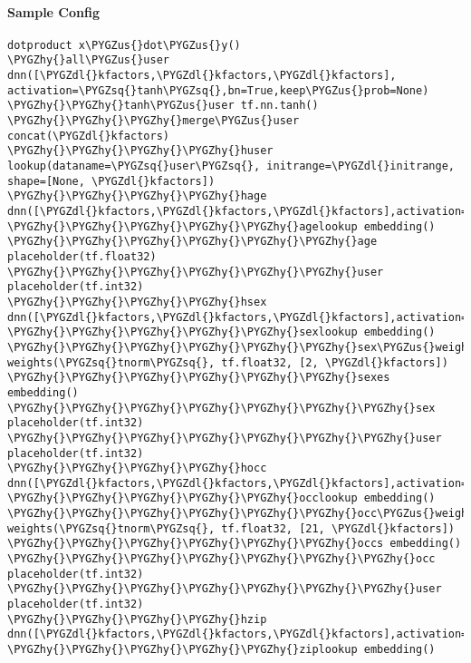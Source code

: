 \documentclass[letterpaper,10pt,english]{sphinxmanual}
\def\PYGZus{\char`\_}
\def\PYGZdl{\char`\$}
\def\PYGZhy{\char`\-}
\def\PYGZsq{\char`\'}
\renewcommand\PYGZsq{\textquotesingle}
\begin{document}
\paragraph{Sample Config}
\label{models:id5}
\begin{Verbatim}[commandchars=\\\{\}]
dotproduct x\PYGZus{}dot\PYGZus{}y()
\PYGZhy{}all\PYGZus{}user dnn([\PYGZdl{}kfactors,\PYGZdl{}kfactors,\PYGZdl{}kfactors], activation=\PYGZsq{}tanh\PYGZsq{},bn=True,keep\PYGZus{}prob=None)
\PYGZhy{}\PYGZhy{}tanh\PYGZus{}user tf.nn.tanh()
\PYGZhy{}\PYGZhy{}\PYGZhy{}merge\PYGZus{}user concat(\PYGZdl{}kfactors)
\PYGZhy{}\PYGZhy{}\PYGZhy{}\PYGZhy{}huser lookup(dataname=\PYGZsq{}user\PYGZsq{}, initrange=\PYGZdl{}initrange, shape=[None, \PYGZdl{}kfactors])
\PYGZhy{}\PYGZhy{}\PYGZhy{}\PYGZhy{}hage dnn([\PYGZdl{}kfactors,\PYGZdl{}kfactors,\PYGZdl{}kfactors],activation=\PYGZsq{}tanh\PYGZsq{},bn=True,keep\PYGZus{}prob=None)
\PYGZhy{}\PYGZhy{}\PYGZhy{}\PYGZhy{}\PYGZhy{}agelookup embedding()
\PYGZhy{}\PYGZhy{}\PYGZhy{}\PYGZhy{}\PYGZhy{}\PYGZhy{}age placeholder(tf.float32)
\PYGZhy{}\PYGZhy{}\PYGZhy{}\PYGZhy{}\PYGZhy{}\PYGZhy{}user placeholder(tf.int32)
\PYGZhy{}\PYGZhy{}\PYGZhy{}\PYGZhy{}hsex dnn([\PYGZdl{}kfactors,\PYGZdl{}kfactors,\PYGZdl{}kfactors],activation=\PYGZsq{}tanh\PYGZsq{},bn=True,keep\PYGZus{}prob=None)
\PYGZhy{}\PYGZhy{}\PYGZhy{}\PYGZhy{}\PYGZhy{}sexlookup embedding()
\PYGZhy{}\PYGZhy{}\PYGZhy{}\PYGZhy{}\PYGZhy{}\PYGZhy{}sex\PYGZus{}weights weights(\PYGZsq{}tnorm\PYGZsq{}, tf.float32, [2, \PYGZdl{}kfactors])
\PYGZhy{}\PYGZhy{}\PYGZhy{}\PYGZhy{}\PYGZhy{}\PYGZhy{}sexes embedding()
\PYGZhy{}\PYGZhy{}\PYGZhy{}\PYGZhy{}\PYGZhy{}\PYGZhy{}\PYGZhy{}sex placeholder(tf.int32)
\PYGZhy{}\PYGZhy{}\PYGZhy{}\PYGZhy{}\PYGZhy{}\PYGZhy{}\PYGZhy{}user placeholder(tf.int32)
\PYGZhy{}\PYGZhy{}\PYGZhy{}\PYGZhy{}hocc dnn([\PYGZdl{}kfactors,\PYGZdl{}kfactors,\PYGZdl{}kfactors],activation=\PYGZsq{}tanh\PYGZsq{},bn=True,keep\PYGZus{}prob=None)
\PYGZhy{}\PYGZhy{}\PYGZhy{}\PYGZhy{}\PYGZhy{}occlookup embedding()
\PYGZhy{}\PYGZhy{}\PYGZhy{}\PYGZhy{}\PYGZhy{}\PYGZhy{}occ\PYGZus{}weights weights(\PYGZsq{}tnorm\PYGZsq{}, tf.float32, [21, \PYGZdl{}kfactors])
\PYGZhy{}\PYGZhy{}\PYGZhy{}\PYGZhy{}\PYGZhy{}\PYGZhy{}occs embedding()
\PYGZhy{}\PYGZhy{}\PYGZhy{}\PYGZhy{}\PYGZhy{}\PYGZhy{}\PYGZhy{}occ placeholder(tf.int32)
\PYGZhy{}\PYGZhy{}\PYGZhy{}\PYGZhy{}\PYGZhy{}\PYGZhy{}\PYGZhy{}user placeholder(tf.int32)
\PYGZhy{}\PYGZhy{}\PYGZhy{}\PYGZhy{}hzip dnn([\PYGZdl{}kfactors,\PYGZdl{}kfactors,\PYGZdl{}kfactors],activation=\PYGZsq{}tanh\PYGZsq{},bn=True,keep\PYGZus{}prob=None)
\PYGZhy{}\PYGZhy{}\PYGZhy{}\PYGZhy{}\PYGZhy{}ziplookup embedding()

\end{Verbatim}
\end{document}
